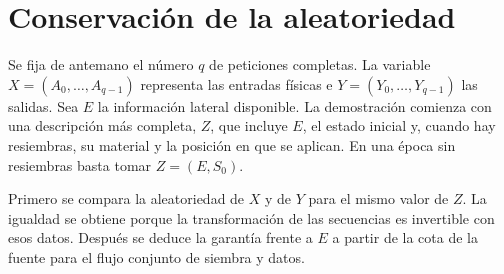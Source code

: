 \documentclass[11pt,a4paper]{article}
\begin{document}
\section{Conservación de la aleatoriedad}\label{sec:its}
Se fija de antemano el número \(q\) de peticiones completas. La variable \(X=(A_0,\ldots,A_{q-1})\) representa las entradas físicas e \(Y=(Y_0,\ldots,Y_{q-1})\) las salidas. Sea \(E\) la información lateral disponible. La demostración comienza con una descripción más completa, \(Z\), que incluye \(E\), el estado inicial y, cuando hay resiembras, su material y la posición en que se aplican. En una época sin resiembras basta tomar \(Z=(E,S_0)\).

Primero se compara la aleatoriedad de \(X\) y de \(Y\) para el mismo valor de \(Z\). La igualdad se obtiene porque la transformación de las secuencias es invertible con esos datos. Después se deduce la garantía frente a \(E\) a partir de la cota de la fuente para el flujo conjunto de siembra y datos.
\end{document}
